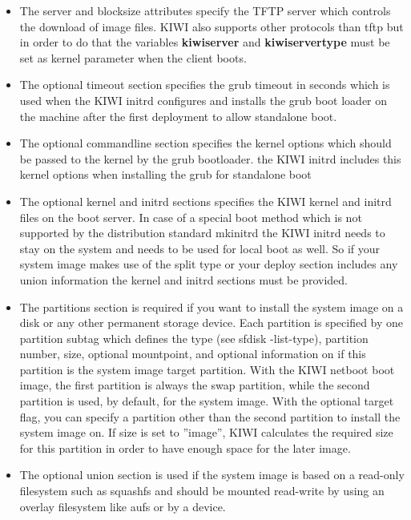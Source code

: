 \begin {itemize}
\item The server and blocksize attributes specify the TFTP server which
      controls the download of image files. KIWI also supports other protocols
      than tftp but in order to do that the variables \textbf{kiwiserver} and
      \textbf{kiwiservertype} must be set as kernel parameter when the client
      boots.
\item The optional timeout section specifies the grub timeout in seconds
      which is used when the KIWI initrd configures and installs the grub boot
      loader on the machine after the first deployment to allow standalone
      boot.
\item The optional commandline section specifies the kernel options which
      should be passed to the kernel by the grub bootloader. the KIWI
      initrd includes this kernel options when installing the grub for
      standalone boot
\item The optional kernel and initrd sections specifies the KIWI
      kernel and initrd files on the boot server. In case of a special boot
      method which is not supported by the distribution standard mkinitrd
      the KIWI initrd needs to stay on the system and needs to be used for
      local boot as well. So if your system image makes use of the split
      type or your deploy section includes any union information the
      kernel and initrd sections must be provided.
\item The partitions section is required if you want to install the system
      image on a disk or any other permanent storage device. Each partition is
      specified by one partition subtag which defines the type (see
      sfdisk -list-type), partition number, size, optional mountpoint, and
      optional information on if this partition is the system image
      target partition. With the KIWI netboot boot image, the first
      partition is always the swap partition, while the second partition
      is used, by default, for the system image. With the optional
      target flag, you can specify a partition other than the second
      partition to install the system image on. If size is set to ''image'',
      KIWI calculates the required size for this partition in order to
      have enough space for the later image.
\item The optional union section is used if the system image is based
      on a read-only filesystem such as squashfs and should be mounted
      read-write by using an overlay filesystem like aufs or by a device.

\end{itemize}
